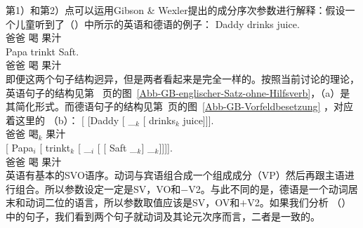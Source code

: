 第1）和第2）点可以运用Gibson \& Wexler提出的成分序次参数进行解释：假设一个儿童听到了（）中所示的英语和德语的例子：
\eal
\ex 
\gll Daddy drinks juice.\\  
    爸爸 喝 果汁\\
\ex 
\gll Papa trinkt Saft.\\
     爸爸 喝 果汁\\
\zl
即便这两个句子结构迥异，但是两者看起来是完全一样的。按照当前讨论的理论，英语句子的结构见第~\pageref{Abb-GB-englischer-Satz-ohne-Hilfsverb} 页的图~\ref{Abb-GB-englischer-Satz-ohne-Hilfsverb}，（a）是其简化形式。而德语句子的结构见第~\pageref{Abb-GB-Vorfeldbesetzung}页的图~\ref{Abb-GB-Vorfeldbesetzung} ，对应着这里的 （b）：
\eal
\ex 
\gll {}[ [Daddy [ \_$_k$ [ drinks$_k$ juice]]].\\  
       {}        \spacebr{}爸爸 \spacebr{} {} {} 喝$_k$ 果汁\\
\ex 
\gll {}[ Papa$_i$ [ trinkt$_k$ [ \_$_i$ [ [ Saft \_$_k$] \_$_k$]]]].\\  
   {} 爸爸 {} 喝 {} {} {} {} 果汁\\
\zl
英语有基本的SVO语序。动词与宾语组合成一个组成成分（VP）然后再跟主语进行组合。所以参数设定一定是SV，VO和$-$V2。与此不同的是，德语是一个动词居末和动词二位的语言，所以参数取值应该是SV，OV和$+$V2。如果我们分析 （）中的句子，我们看到两个句子就动词及其论元次序而言，二者是一致的。


